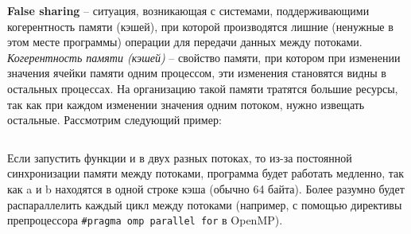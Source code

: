 \textbf{False sharing} -- ситуация, возникающая с системами, поддерживающими когерентность памяти (кэшей), при которой производятся лишние (ненужные в этом месте программы) операции для передачи данных между потоками. \textit{Когерентность памяти (кэшей)} -- свойство памяти, при котором при изменении значения ячейки памяти одним процессом, эти изменения становятся видны в остальных процессах. На организацию такой памяти тратятся большие ресурсы, так как при каждом изменении значения одним потоком, нужно извещать остальные. Рассмотрим следующий пример: 

\inputminted{c++}{listings/falseSharingExample.cpp}

Если запустить функции  и  в двух разных потоках, то из-за постоянной синхронизации памяти между потоками, программа будет работать медленно, так как a и b находятся в одной строке кэша (обычно 64 байта). Более разумно будет распараллелить каждый цикл между потоками (например, с помощью директивы препроцессора \texttt{\#pragma omp parallel for} в OpenMP).